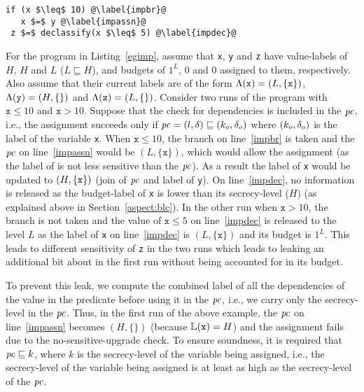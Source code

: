 \begin{lstlisting}[float,caption=Illustration of handling of
  implicit flows,label=egimp]
 if (x $\leq$ 10) @\label{impbr}@
   x $=$ y @\label{impassn}@
 z $=$ declassify(x $\leq$ 5) @\label{impdec}@
\end{lstlisting}

For the program in Listing~\ref{egimp}, assume that \texttt{x},
\texttt{y} and \texttt{z} have value-labels of $H$, $H$ and $L$ ($L
\sqsubseteq H$), and budgets of $1^L$, $0$ and $0$ assigned to them,
respectively. Also assume that their current labels are of the
form $\Lambda(\texttt{x}) = (L, \{\texttt{x}\})$, $\Lambda(\texttt{y}) = (H,
\{\})$ and $\Lambda(\texttt{z}) = (L, \{\})$. 
Consider two runs of the program with $\texttt{x} \leq 10$ and
$\texttt{x} > 10$. Suppose that the check for dependencies is included
in the $\mathit{pc}$, i.e., the assignment succeeds only if $\mathit{pc} = (l, \delta)
\sqsubseteq (k_o, \delta_o)$ where $(k_o, \delta_o)$ is the label of the
variable \texttt{x}.  When $\texttt{x} \leq 10$, the branch on
line~\ref{impbr} is taken and the $\mathit{pc}$ on line~\ref{impassn} would be
$(L, \{\texttt{x}\})$, which would allow the assignment (as the label 
of  is not less sensitive than the $\mathit{pc}$). As a result the label
of \texttt{x} would be updated to $(H, \{\texttt{x}\})$ (join of $\mathit{pc}$ and
label of \texttt{y}). On line~\ref{impdec}, no information is
released as the budget-label of \texttt{x} is lower than its
secrecy-level ($H$) (as explained above in
Section~\ref{aspect:blc}). In the other run when 
$\texttt{x} > 10$, the branch is not taken and the value of
$\texttt{x} \leq 5$ on line~\ref{impdec} is released to the level $L$
as the label of \texttt{x} on line~\ref{impdec} is $(L,
\{\texttt{x}\})$ and its budget is $1^L$. This leads to different
sensitivity of \texttt{z} in the two runs which leads to leaking an
additional bit about  in the first run without being accounted
for in its budget. 

To prevent this leak, we compute the combined label of all the
dependencies of the value in the predicate before using it in the
$\mathit{pc}$, i.e., we carry only the secrecy-level in the $\mathit{pc}$. Thus, in
the first run of the above example, the $\mathit{pc}$ on line~\ref{impassn}
becomes $(H, \{\})$ (because $\mathbb{L}(\texttt{x}) = H$) and the
assignment fails due to the no-sensitive-upgrade check. To ensure
soundness, it is required that $\mathit{pc} \sqsubseteq k$, where $k$ is the
secrecy-level of the variable being assigned, i.e., the secrecy-level
of the variable being assigned is at least as high as the
secrecy-level of the $\mathit{pc}$. 

